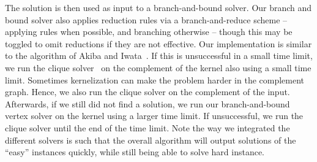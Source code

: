 \documentclass[a4paper,UKenglish]{lipics-v2016}
\begin{document}
The solution is then used as input to a branch-and-bound solver. Our branch and bound solver also applies reduction rules via a branch-and-reduce scheme -- applying rules when possible, and branching otherwise -- though this may be toggled to omit reductions if they are not effective.
Our implementation is similar to the algorithm of Akiba and Iwata~\cite{akiba-tcs-2016}. If this is unsuccessful in a small time limit, we run the clique solver~\cite{DBLP:journals/cor/LiJM17} on the complement of the kernel also using a small time limit. Sometimes kernelization can make the problem harder in the complement graph. Hence, we also run the clique solver on the complement of the input. Afterwards, if we still did not find a solution, we run our branch-and-bound vertex solver on the kernel using a larger time limit. If unsuccessful, we run the clique solver until the end of the time limit. Note the way we integrated the different solvers is such that the overall algorithm will output solutions of the ``easy'' instances quickly, while still being able to solve hard instance.



\end{document}
